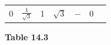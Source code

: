 {{\begin{center}
\begin{tabular}[t]{|l|l|l|l|l|l|l|}
    
        0 &
    
    
        
                \begin{math}\frac{1}{\sqrt{3}}\end{math}
               &
    
    
        1 &
    
    
        
                \begin{math}\sqrt{3}\end{math}
               &
    
    
        
                \begin{math}-\end{math}
               &
    
    
        0%
     \tabularnewline\cline{1-1}\cline{2-2}\cline{3-3}\cline{4-4}\cline{5-5}\cline{6-6}\cline{7-7}
    \end{tabular}
      \end{center}
    \begin{center}{\small\bfseries Table 14.3}\end{center}
    
}}
